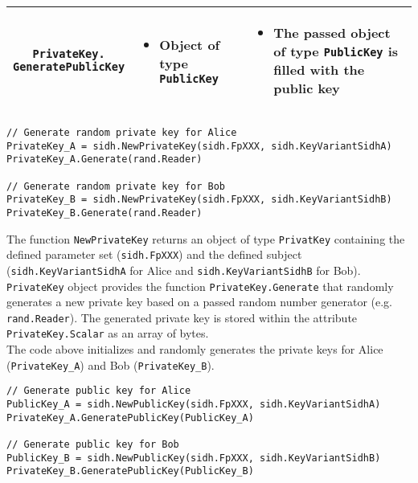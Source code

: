 \begin{table}[H]
\begin{tabular}{| c|m{4.8cm}|m{4.8cm}|}
        \makecell{\texttt{PrivateKey.}\\\texttt{GeneratePublicKey}} &
                \begin{itemize}[noitemsep, leftmargin=*]
            \item Object of type \texttt{PublicKey}
        \end{itemize} & 
        \begin{itemize}[noitemsep, leftmargin=*]
            \item The passed object of type \texttt{PublicKey} is filled with the public key
        \end{itemize} \\
        \hline
    \end{tabular}
\end{table}



\begin{lstlisting}[]
// Generate random private key for Alice
PrivateKey_A = sidh.NewPrivateKey(sidh.FpXXX, sidh.KeyVariantSidhA)
PrivateKey_A.Generate(rand.Reader)

// Generate random private key for Bob
PrivateKey_B = sidh.NewPrivateKey(sidh.FpXXX, sidh.KeyVariantSidhB)
PrivateKey_B.Generate(rand.Reader)
\end{lstlisting}
The function \texttt{NewPrivateKey} returns an object of type \texttt{PrivatKey} containing the defined parameter set (\texttt{sidh.FpXXX}) and the defined subject (\texttt{sidh.KeyVariantSidhA} for Alice and \texttt{sidh.KeyVariantSidhB} for Bob). \texttt{PrivateKey} object provides the function \texttt{PrivateKey.Generate} that randomly generates a new private key based on a passed random number generator (e.g. \texttt{rand.Reader}). The generated private key is stored within the attribute \texttt{PrivateKey.Scalar} as an array of bytes.\\
The code above initializes and randomly generates the private keys for Alice (\textcolor{keywordcol}{\texttt{PrivateKey\_A}}) and Bob (\textcolor{keywordcol}{\texttt{PrivateKey\_B}}).\\

\begin{lstlisting}[]
// Generate public key for Alice
PublicKey_A = sidh.NewPublicKey(sidh.FpXXX, sidh.KeyVariantSidhA)
PrivateKey_A.GeneratePublicKey(PublicKey_A)

// Generate public key for Bob
PublicKey_B = sidh.NewPublicKey(sidh.FpXXX, sidh.KeyVariantSidhB)
PrivateKey_B.GeneratePublicKey(PublicKey_B)
\end{lstlisting}

